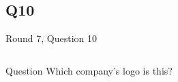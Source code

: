 \documentclass[11pt]{beamer}
\begin{document}
\subsection*{Q10}
\begin{frame}[t]{Round 7, Question 10}
\begin{columns}[T,totalwidth=\linewidth]
\begin{column}{0.32\linewidth}
\begin{block}{Question}
Which company's logo is this?
\end{block}
\end{column}
\begin{column}{0.65\linewidth}
\begin{center}
\texttt{[image: \{Images/reebokicon]}.jpg}
\end{center}
\end{column}
\end{columns}
\end{frame}
\end{document}

